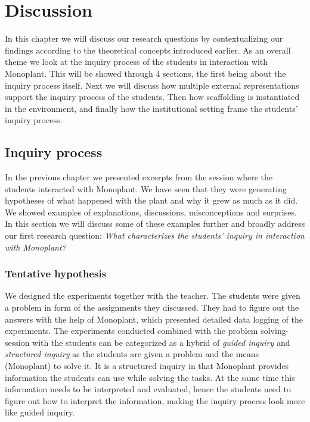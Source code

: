\chapter{Discussion}
In this chapter we will discuss our research questions by contextualizing our findings according to the theoretical concepts introduced earlier. As an overall theme we look at the inquiry process of the students in interaction with Monoplant. This will be showed through 4 sections, the first being about the inquiry process itself. Next we will discuss how multiple external representations support the inquiry process of the students. Then how scaffolding is instantiated in the environment, and finally how the institutional setting frame the students' inquiry process.


\section{Inquiry process}
In the previous chapter we presented excerpts from the session where the students interacted with Monoplant. We have seen that they were generating hypotheses of what happened with the plant and why it grew as much as it did. We showed examples of explanations, discussions, misconceptions and surprises. In this section we will discuss some of these examples further and broadly address our first research question: \emph{What characterizes the students' inquiry in interaction with Monoplant?}

\subsection{Tentative hypothesis}
We designed the experiments together with the teacher. The students were given a problem in form of the assignments they discussed. They had to figure out the answers with the help of Monoplant, which presented detailed data logging of the experiments. The experiments conducted combined with the problem solving-session with the students can be categorized as a hybrid of \emph{guided inquiry} and \emph{structured inquiry} \citetext{\citealp{staver1987analysis}, referenced in \citealp{prince2006inductive}} as the students are given a problem and the means (Monoplant) to solve it. It is a structured inquiry in that Monoplant provides information  the students can use while solving the tasks. At the same time this information needs to be interpreted and evaluated, hence the students need to figure out how to interpret the information, making the inquiry process look more like guided inquiry.

